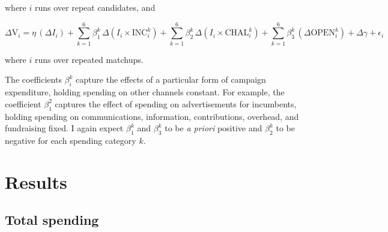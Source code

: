 \documentclass{article}
\begin{document}
where $i$ runs over repeat candidates, and

\begin{equation}
\Delta \text{V}_{i} = \eta \, (\Delta I_{i}) + \sum \limits_{k=1}^6 \beta^k_1 \, \Delta ( I_i \times \text{INC}^k_{i} ) + \sum \limits_{k=1}^6 \beta^k_2 \, \Delta ( I_i \times \text{CHAL}^k_{i} ) + \sum \limits_{k=1}^6 \beta_3^k \, (\Delta \text{OPEN}^k_{i}) + \Delta \gamma + \epsilon_{i}
\label{eq:breakdown-diff2}
\end{equation}

where $i$ runs over repeated matchups.

The coefficients $\beta_i^k$ capture the effects of a particular form of campaign expenditure, holding spending on other channels constant. For example, the coefficient $\beta_1^2$ captures the effect of spending on advertisements for incumbents, holding spending on communications, information, contributions, overhead, and fundraising fixed. I again expect $\beta_1^k$ and $\beta_3^k$ to be \textit{a priori} positive and $\beta_2^k$ to be negative for each spending category $k$.

\section{Results}

\subsection{Total spending}
\end{document}

